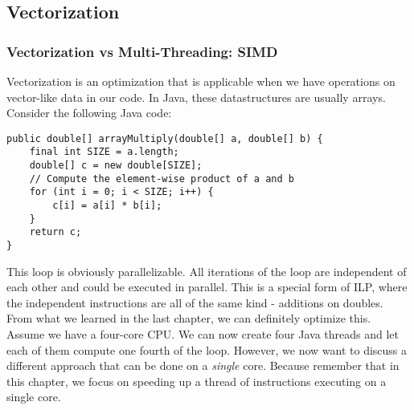 \documentclass[main.tex]{subfiles}
\begin{document}
\subsection{Vectorization}
\label{vectorization}
\subsubsection{Vectorization vs Multi-Threading: SIMD}
Vectorization is an optimization that is applicable when we have operations on vector-like data in our code. In Java, these datastructures are usually arrays. Consider the following Java code:
\begin{verbatim}
public double[] arrayMultiply(double[] a, double[] b) {
    final int SIZE = a.length;
    double[] c = new double[SIZE];
    // Compute the element-wise product of a and b
    for (int i = 0; i < SIZE; i++) {
        c[i] = a[i] * b[i];
    }
    return c;
}
\end{verbatim}
This loop is obviously parallelizable. All iterations of the loop are independent of each other and could be executed in parallel. This is a special form of ILP, where the independent instructions are all of the same kind - additions on doubles. From what we learned in the last chapter, we can definitely optimize this. Assume we have a four-core CPU. We can now create four Java threads and let each of them compute one fourth of the loop. However, we now want to discuss a different approach that can be done on a \textit{single} core. Because remember that in this chapter, we focus on speeding up a thread of instructions executing on a single core.
\end{document}
